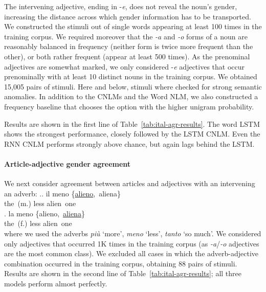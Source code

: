 The intervening adjective, ending in -\emph{e}, does not reveal the
noun's gender, increasing the distance across which gender information
has to be transported. We constructed the stimuli out of single words
appearing at least 100 times in the training corpus. We required
moreover that the \emph{-a} and \emph{-o} forms of a noun are
reasonably balanced in frequency (neither form is twice more frequent
than the other), or both rather frequent (appear at least 500
times). As the prenominal adjectives are somewhat marked, we only
considered -\emph{e} adjectives that occur prenominally with at least
10 distinct nouns in the training corpus. We obtained 15,005 pairs of stimuli.
Here and below, stimuli
where checked for strong semantic anomalies.
In addition to the CNLMs and the Word NLM, we also constructed a frequency baseline that chooses the option with the higher unigram probability.

Results are shown in the first line of
Table~\ref{tab:ital-agr-results}.  The word LSTM shows the strongest
performance, closely followed by the LSTM CNLM.  Even the RNN CNLM
performs strongly above chance, but again lags behind the LSTM.

\paragraph{Article-adjective gender agreement}
We next consider agreement between articles and adjectives with an intervening an adverb:
\ex.\ag. il meno \{\underline{alieno},\ aliena\} \\
the\ (m.) less alien\ one \\
\bg. la meno \{alieno,\ \underline{aliena}\} \\
the\ (f.) less alien\ one \\

where we used the adverbs \emph{pi{\`u}} `more', \emph{meno} `less',
\emph{tanto} `so much'. We considered only adjectives that occurred 1K
times in the training corpus (as \emph{-a}/\emph{-o} adjectives are
the most common class). We excluded all cases in which the
adverb-adjective combination occurred in the training corpus, obtaining 88 pairs of stimuli. %
Results are shown in the second line of Table~\ref{tab:ital-agr-results}; all three models perform almost perfectly.


